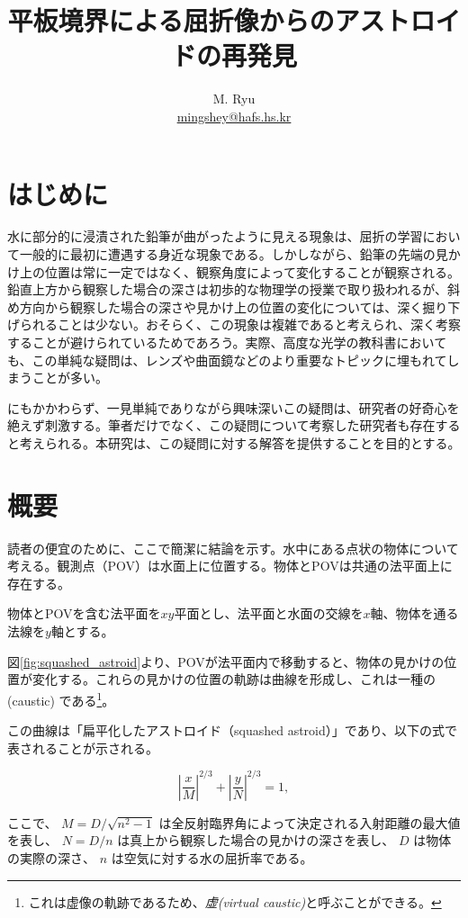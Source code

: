 \documentclass[twocolumn]{article}
\title{平板境界による屈折像からのアストロイドの再発見}  %
\author{M. Ryu \\ {\href{mailto:mingshey@hafs.hs.kr}{mingshey@hafs.hs.kr}}}
\begin{document}
\renewcommand{\figurename}{図}
	\maketitle
	
	\section{はじめに}
	
	水に部分的に浸漬された鉛筆が曲がったように見える現象は、屈折の学習において一般的に最初に遭遇する身近な現象である。しかしながら、鉛筆の先端の見かけ上の位置は常に一定ではなく、観察角度によって変化することが観察される。鉛直上方から観察した場合の深さは初歩的な物理学の授業で取り扱われるが、斜め方向から観察した場合の深さや見かけ上の位置の変化については、深く掘り下げられることは少ない。おそらく、この現象は複雑であると考えられ、深く考察することが避けられているためであろう。実際、高度な光学の教科書においても、この単純な疑問は、レンズや曲面鏡などのより重要なトピックに埋もれてしまうことが多い。
	
	にもかかわらず、一見単純でありながら興味深いこの疑問は、研究者の好奇心を絶えず刺激する。筆者だけでなく、この疑問について考察した研究者も存在すると考えられる。本研究は、この疑問に対する解答を提供することを目的とする。

\section{概要}

読者の便宜のために、ここで簡潔に結論を示す。水中にある点状の物体について考える。観測点（POV）は水面上に位置する。物体とPOVは共通の法平面上に存在する。

物体とPOVを含む法平面を$xy$平面とし、法平面と水面の交線を$x$軸、物体を通る法線を$y$軸とする。

図\ref{fig:squashed_astroid}より、POVが法平面内で移動すると、物体の見かけの位置が変化する。これらの見かけの位置の軌跡は曲線を形成し、これは一種の(caustic) である\footnote{これは虚像の軌跡であるため、\textit{虚(virtual caustic)}と呼ぶことができる。}。

この曲線は「扁平化したアストロイド（squashed astroid）」であり、以下の式で表されることが示される。

$$ \left| \dfrac{x}{M} \right| ^ {2/3} + \left| \dfrac{y}{N} \right| ^ {2/3} = 1,$$

ここで、
$M = D/\sqrt{n^2 - 1}$ は全反射臨界角によって決定される入射距離の最大値を表し、
$N = D/n$ は真上から観察した場合の見かけの深さを表し、
$D$ は物体の実際の深さ、
$n$ は空気に対する水の屈折率である。
\end{document}

